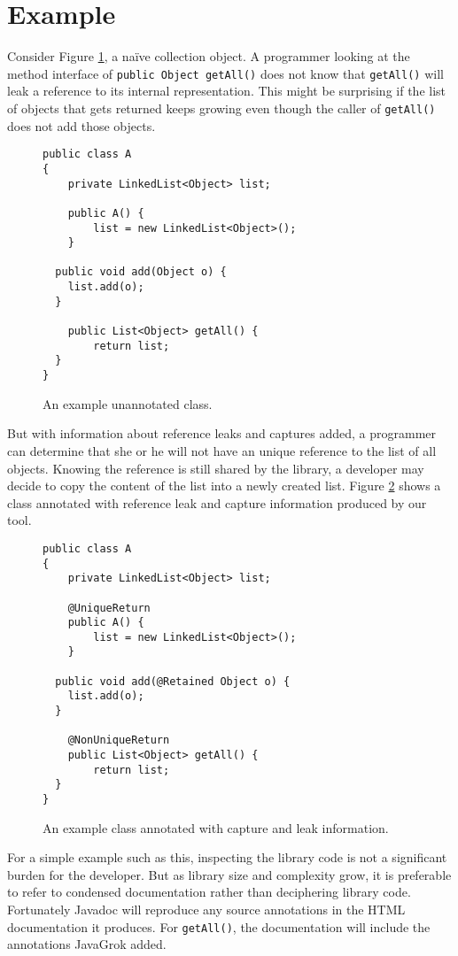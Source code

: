 \section{Example}
\label{sec:Example}

Consider Figure \ref{fig:pre}, a na\"ive collection object.
A programmer looking at the method interface of 
\texttt{public Object getAll()} does not know
that \texttt{getAll()} will leak a reference to its
internal representation. This might be surprising
if the list of objects that gets returned keeps growing
even though the caller of \texttt{getAll()} does not add those objects.

\begin{figure}[t]
\begin{lstlisting}
public class A
{
	private LinkedList<Object> list;
		
	public A() {
		list = new LinkedList<Object>();
	}
		
  public void add(Object o) {
   	list.add(o);
  }
    
	public List<Object> getAll() {
		return list;
  }
}
\end{lstlisting}
\caption{An example unannotated class.}
\label{fig:pre}
\end{figure}

But with information about reference leaks and captures added, a programmer can 
determine that she or he will not have an unique reference
to the list of all objects.  Knowing the reference is still shared by the
library, a developer may decide to copy the content 
of the list into a newly created list.  Figure \ref{fig:postannotation}
shows a class annotated with reference leak and capture information produced by
our tool.

\begin{figure}[t!]
\begin{lstlisting}
public class A
{
	private LinkedList<Object> list;
	
	@UniqueReturn
	public A() {
		list = new LinkedList<Object>();
	}
		
  public void add(@Retained Object o) {
   	list.add(o);
  }
  
	@NonUniqueReturn
	public List<Object> getAll() {
		return list;
  }
}
\end{lstlisting}
\caption{An example class annotated with capture and leak information.}
\label{fig:postannotation}
\end{figure}

For a simple example such as this, inspecting the library code is not a
significant burden for the developer.  But as library size and complexity grow,
it is preferable to refer to condensed documentation rather than
deciphering library code.
Fortunately Javadoc will reproduce any source annotations in the HTML
documentation it produces.  For \texttt{getAll()}, the documentation will
include the annotations JavaGrok added.
